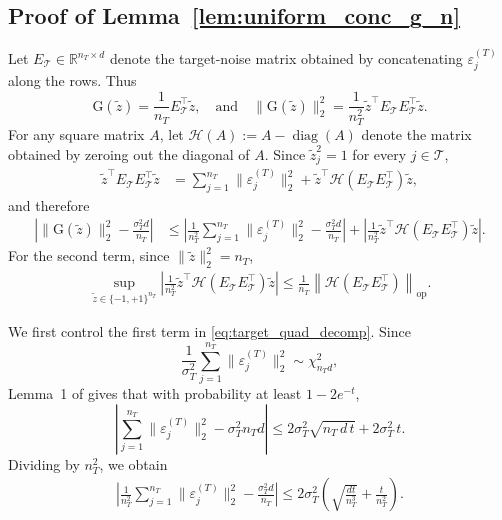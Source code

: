 \documentclass[10pt]{article}
\newcommand{\op}{\mathrm{op}}
\newcommand{\wt}{\widetilde}
\newcommand{\calT}{\mathcal T}
\newcommand{\trg}{T}
\newcommand{\nT}{n_{\trg}}
\newcommand{\sigmaT}{\sigma_{\trg}}
\begin{document}
\subsection{Proof of Lemma~\ref{lem:uniform_conc_g_n}}
Let $E_\calT\in\mathbb R^{\nT\times d}$ denote the target-noise matrix obtained by concatenating $\varepsilon_j^{(\trg)}$ along the rows. Thus
\[
\mathrm G(\wt z)=\frac{1}{\nT}E_\calT^\top \wt z, \quad \mbox{and} \quad \|\mathrm G(\wt z)\|_2^2=\frac{1}{\nT^2}\wt z^\top E_\calT E_\calT^\top\wt z.
\]
For any square matrix $A$, let $\mathcal H(A):=A-\operatorname{diag}(A)$ denote the matrix obtained by zeroing out the diagonal of $A$. Since $\wt z_j^2=1$ for every $j\in\calT$,
\begin{align}
\wt z^\top E_\calT E_\calT^\top\wt z&=
    \sum_{j=1}^{\nT}\|\varepsilon_j^{(\trg)}\|_2^2+
    \wt z^\top
    \mathcal H\!\left(E_\calT E_\calT^\top\right)
    \wt z,
\end{align}
and therefore
\begin{align}
\left|\|\mathrm G(\wt z)\|_2^2-\frac{\sigmaT^2d}{\nT}\right|&\le\left|\frac{1}{\nT^2}\sum_{j=1}^{\nT}\|\varepsilon_j^{(\trg)}\|_2^2-\frac{\sigmaT^2d}{\nT}\right|+\left|\frac{1}{\nT^2}\wt z^\top\mathcal H\!\left(E_\calT E_\calT^\top\right)\wt z\right|.
    \label{eq:target_quad_decomp}
\end{align}
For the second term, since $\|\wt z\|_2^2=\nT$,
\begin{align}
    \sup_{\wt z\in\{-1,+1\}^{\nT}}\left|\frac{1}{\nT^2}\wt z^\top\mathcal H\!\left(E_\calT E_\calT^\top\right)\wt z\right|
    \le\frac{1}{\nT}\left\|\mathcal H\!\left(E_\calT E_\calT^\top\right)\right\|_{\op}.
    \label{eq:target_off_diag_op}
\end{align}

We first control the first term in \eqref{eq:target_quad_decomp}. Since
\[
    \frac{1}{\sigmaT^2}\sum_{j=1}^{\nT}\|\varepsilon_j^{(\trg)}\|_2^2\sim \chi^2_{\nT d},
\]
Lemma~1 of \cite{laurent2000adaptive} gives that with probability at least $1-2e^{-t}$,
\[
\left|\sum_{j=1}^{\nT}\|\varepsilon_j^{(\trg)}\|_2^2-\sigmaT^2\nT d\right|
\le 2\sigmaT^2\sqrt{\nT\,d\,t}+2\sigmaT^2\,t .
\]
Dividing by $\nT^2$, we obtain
\begin{align}
\left|\frac{1}{\nT^2}\sum_{j=1}^{\nT}\|\varepsilon_j^{(\trg)}\|_2^2-
\frac{\sigmaT^2d}{\nT}\right|\le2\sigmaT^2\left(\sqrt{\frac{dt}{\nT^3}}+\frac{t}{\nT^2}\right).
    \label{eq:target_diag_bound}
\end{align}
\end{document}
